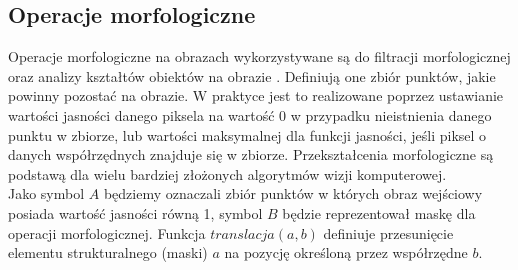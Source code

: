 \subsection{Operacje morfologiczne}
Operacje morfologiczne na obrazach wykorzystywane są do filtracji morfologicznej oraz analizy kształtów obiektów na obrazie \cite{soille03}. Definiują one zbiór punktów, jakie powinny pozostać na obrazie. W praktyce jest to realizowane poprzez ustawianie wartości jasności danego piksela na wartość 0 w przypadku nieistnienia danego punktu w zbiorze, lub wartości maksymalnej dla funkcji jasności, jeśli piksel o danych współrzędnych znajduje się w zbiorze. Przekształcenia morfologiczne są podstawą dla wielu bardziej złożonych algorytmów wizji komputerowej.\\
Jako symbol $A$ będziemy oznaczali zbiór punktów w których obraz wejściowy posiada wartość jasności równą 1, symbol $B$ będzie reprezentował maskę dla operacji morfologicznej. Funkcja $translacja(a, b)$ definiuje przesunięcie elementu strukturalnego (maski) $a$ na pozycję określoną przez współrzędne $b$.
